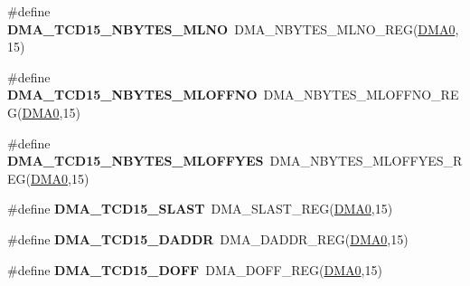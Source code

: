 \begin{DoxyCompactItemize}
\item 
\#define {\bfseries D\+M\+A\+\_\+\+T\+C\+D15\+\_\+\+N\+B\+Y\+T\+E\+S\+\_\+\+M\+L\+NO}~D\+M\+A\+\_\+\+N\+B\+Y\+T\+E\+S\+\_\+\+M\+L\+N\+O\+\_\+\+R\+EG(\hyperlink{group__DMA__Peripheral__Access__Layer_ga4103044f9ca209772f513dc694513ffb}{D\+M\+A0},15)\hypertarget{group__DMA__Register__Accessor__Macros_ga88b7235ecd3b35d9a897ff174187fc8a}{}\label{group__DMA__Register__Accessor__Macros_ga88b7235ecd3b35d9a897ff174187fc8a}

\item 
\#define {\bfseries D\+M\+A\+\_\+\+T\+C\+D15\+\_\+\+N\+B\+Y\+T\+E\+S\+\_\+\+M\+L\+O\+F\+F\+NO}~D\+M\+A\+\_\+\+N\+B\+Y\+T\+E\+S\+\_\+\+M\+L\+O\+F\+F\+N\+O\+\_\+\+R\+EG(\hyperlink{group__DMA__Peripheral__Access__Layer_ga4103044f9ca209772f513dc694513ffb}{D\+M\+A0},15)\hypertarget{group__DMA__Register__Accessor__Macros_ga60e6538f7c7033e20c33a8a09b5748fe}{}\label{group__DMA__Register__Accessor__Macros_ga60e6538f7c7033e20c33a8a09b5748fe}

\item 
\#define {\bfseries D\+M\+A\+\_\+\+T\+C\+D15\+\_\+\+N\+B\+Y\+T\+E\+S\+\_\+\+M\+L\+O\+F\+F\+Y\+ES}~D\+M\+A\+\_\+\+N\+B\+Y\+T\+E\+S\+\_\+\+M\+L\+O\+F\+F\+Y\+E\+S\+\_\+\+R\+EG(\hyperlink{group__DMA__Peripheral__Access__Layer_ga4103044f9ca209772f513dc694513ffb}{D\+M\+A0},15)\hypertarget{group__DMA__Register__Accessor__Macros_ga95fb2cb3eb8f170bf832c7b018a96ec5}{}\label{group__DMA__Register__Accessor__Macros_ga95fb2cb3eb8f170bf832c7b018a96ec5}

\item 
\#define {\bfseries D\+M\+A\+\_\+\+T\+C\+D15\+\_\+\+S\+L\+A\+ST}~D\+M\+A\+\_\+\+S\+L\+A\+S\+T\+\_\+\+R\+EG(\hyperlink{group__DMA__Peripheral__Access__Layer_ga4103044f9ca209772f513dc694513ffb}{D\+M\+A0},15)\hypertarget{group__DMA__Register__Accessor__Macros_gab67f5b3eb4380c25b5017ac231f273b8}{}\label{group__DMA__Register__Accessor__Macros_gab67f5b3eb4380c25b5017ac231f273b8}

\item 
\#define {\bfseries D\+M\+A\+\_\+\+T\+C\+D15\+\_\+\+D\+A\+D\+DR}~D\+M\+A\+\_\+\+D\+A\+D\+D\+R\+\_\+\+R\+EG(\hyperlink{group__DMA__Peripheral__Access__Layer_ga4103044f9ca209772f513dc694513ffb}{D\+M\+A0},15)\hypertarget{group__DMA__Register__Accessor__Macros_ga96883b08084e57c2324a7a945fcc7107}{}\label{group__DMA__Register__Accessor__Macros_ga96883b08084e57c2324a7a945fcc7107}

\item 
\#define {\bfseries D\+M\+A\+\_\+\+T\+C\+D15\+\_\+\+D\+O\+FF}~D\+M\+A\+\_\+\+D\+O\+F\+F\+\_\+\+R\+EG(\hyperlink{group__DMA__Peripheral__Access__Layer_ga4103044f9ca209772f513dc694513ffb}{D\+M\+A0},15)\hypertarget{group__DMA__Register__Accessor__Macros_gab3f5f71e56f4d63ef32d03ec031b3b45}{}\label{group__DMA__Register__Accessor__Macros_gab3f5f71e56f4d63ef32d03ec031b3b45}


\end{DoxyCompactItemize}
